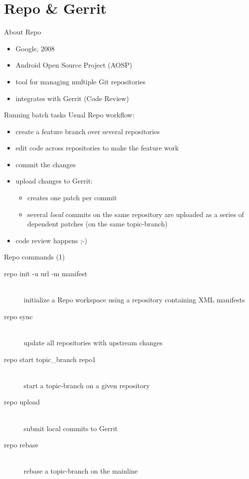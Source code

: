 \section{Repo \& Gerrit}
\begin{frame}{About Repo}
  \begin{itemize}
    \item Google, 2008
    \item Android Open Source Project (AOSP)
    \item tool for managing multiple Git repositories
    \item integrates with Gerrit (Code Review)
  \end{itemize}
\end{frame}

\begin{frame}{Running batch tasks}
  Usual Repo workflow:
  \begin{itemize}
    \item create a feature branch over several repositories
    \item edit code across repositories to make the feature work
    \item commit the changes
    \item upload changes to Gerrit:
      \begin{itemize}
        \item creates one patch per commit
        \item several \textit{local} commits on the same repository are uploaded
          as a series of dependent patches (on the same topic-branch)
      \end{itemize}
    \item code review happens ;-)
  \end{itemize}
\end{frame}

\begin{frame}{Repo commands (1)}
  \begin{description}
    \item[repo init -u url -m manifest] \hfill \\
      initialize a Repo workspace using a repository containing XML manifests
    \item[repo sync] \hfill \\
      update all repositories with upstream changes
    \item[repo start topic\_branch repo1] \hfill \\
      start a topic-branch on a given repository
    \item[repo upload] \hfill \\
      submit local commits to Gerrit
    \item[repo rebase] \hfill \\
      rebase a topic-branch on the mainline
  \end{description}
\end{frame}

